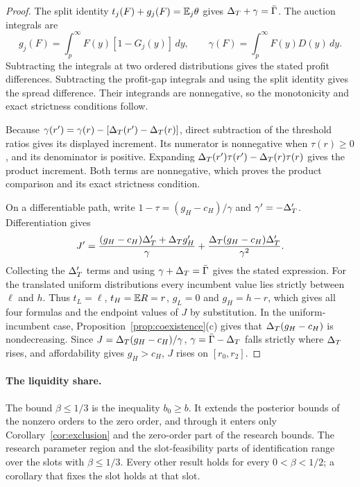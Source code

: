 \begin{proof}
The split identity \(t_j(F)+g_j(F)=\mathbb{E}_j\theta\) gives
\(\Delta_T+\gamma=\bar\Gamma\). The auction integrals are
\[
g_j(F)=\int_p^\infty F(y)[1-G_j(y)]\,dy,\qquad
\gamma(F)=\int_p^\infty F(y)D(y)\,dy.
\]
Subtracting the integrals at two ordered distributions gives the stated profit differences. Subtracting the profit-gap
integrals and using the split identity gives the spread difference. Their integrands are nonnegative, so the
monotonicity and exact strictness conditions follow.

Because \(\gamma(r')=\gamma(r)-[\Delta_T(r')-\Delta_T(r)]\), direct subtraction of the threshold ratios gives its displayed
increment. Its numerator is nonnegative when \(\tau(r)\ge0\), and its denominator is positive. Expanding
\(\Delta_T(r')\tau(r')-\Delta_T(r)\tau(r)\) gives the product increment. Both terms are nonnegative, which proves the
product comparison and its exact strictness condition.

On a differentiable path, write \(1-\tau=(g_H-c_H)/\gamma\) and \(\gamma'=-\Delta_T'\). Differentiation gives
\[
J'=\frac{(g_H-c_H)\Delta_T'+\Delta_T g_H'}{\gamma}
       +\frac{\Delta_T(g_H-c_H)\Delta_T'}{\gamma^2}.
\]
Collecting the \(\Delta_T'\) terms and using \(\gamma+\Delta_T=\bar\Gamma\) gives the stated expression.
For the translated uniform distributions every incumbent value lies strictly between \(\ell\) and \(h\).
Thus \(t_L=\ell\), \(t_H=\mathbb{E} R=r\), \(g_L=0\) and \(g_H=h-r\), which gives all four formulas and the endpoint
values of \(J\) by substitution. In the uniform-incumbent case, Proposition~\ref{prop:coexistence}(c) gives that
\(\Delta_T(g_H-c_H)\) is nondecreasing. Since \(J=\Delta_T(g_H-c_H)/\gamma\), \(\gamma=\bar\Gamma-\Delta_T\) falls strictly where
\(\Delta_T\) rises, and affordability gives \(g_H>c_H\), \(J\) rises on \([r_0,r_2]\).
\end{proof}

\paragraph{The liquidity share.}\label{par:beta-scope}
The bound \(\beta\le1/3\) is the inequality \(b_0\ge b\). It extends the posterior bounds of the nonzero orders
to the zero order, and through it enters only Corollary~\ref{cor:exclusion} and the zero-order part of the
research bounds. The research parameter region and the slot-feasibility parts of identification range over the
slots with \(\beta\le1/3\). Every other result holds for every \(0<\beta<1/2\); a corollary that fixes the slot
holds at that slot.

